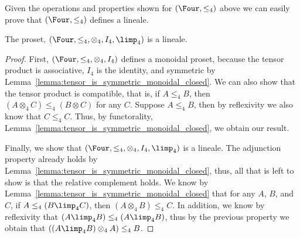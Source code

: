 Given the operations and properties shown for $(\Four, \leq_4)$ above
we can easily prove that $(\Four, \leq_4)$ defines a lineale.
\begin{lemma}
  \label{lemma:four_is_a_lineale}
  The proset, $(\Four, \leq_4, \otimes_4, I_4, \limp_4)$ is a lineale.
\end{lemma}
\begin{proof}
  First, $(\Four, \leq_4, \otimes_4, I_4)$ defines a monoidal proset,
  because the tensor product is associative, $I_4$ is the identity,
  and symmetric by
  Lemma~\ref{lemma:tensor_is_symmetric_monoidal_closed}.  We can also
  show that the tensor product is compatible, that is, if $A \leq_4
  B$, then $(A \otimes_4 C) \leq_4 (B \otimes C)$ for any $C$.
  Suppose $A \leq_4 B$, then by reflexivity we also know that $C
  \leq_4 C$.  Thus, by functorality,
  Lemma~\ref{lemma:tensor_is_symmetric_monoidal_closed}, we obtain our
  result.

  Finally, we show that $(\Four, \leq_4, \otimes_4, I_4, \limp_4)$ is
  a lineale.  The adjunction property already holds by
  Lemma~\ref{lemma:tensor_is_symmetric_monoidal_closed}, thus, all
  that is left to show is that the relative complement holds. We know
  by Lemma~\ref{lemma:tensor_is_symmetric_monoidal_closed} that for
  any $A$, $B$, and $C$, if $A \leq_4 (B \limp_4 C)$, then $(A
  \otimes_4 B) \leq_4 C$.  In addition, we know by reflexivity that
  $(A \limp_4 B) \leq_4 (A \limp_4 B)$, thus by the previous property we obtain
  that $((A \limp_4 B) \otimes_4 A) \leq_4 B$.
\end{proof}


